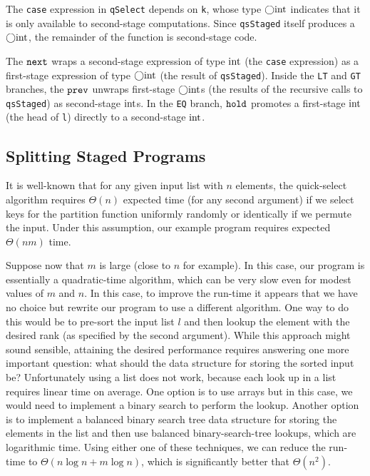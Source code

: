 \begin{abstrsyn}
The \texttt{case} expression in \texttt{qSelect} depends on \texttt{k}, whose
type $\bigcirc{\rm int}$ indicates that it is only available to second-stage
computations. Since \texttt{qsStaged} itself produces a $\bigcirc{\rm int}$, the
remainder of the function is second-stage code.

The ${\tt next}$ wraps a second-stage expression of type ${\rm int}$ (the \texttt{case}
expression) as a first-stage expression of type $\bigcirc{\rm int}$ (the result 
of \texttt{qsStaged}). Inside the \texttt{LT} and \texttt{GT} branches, the
${\tt prev}$ unwraps first-stage $\bigcirc{\rm int}$s (the results of the recursive calls
to \texttt{qsStaged}) as second-stage ${\rm int}$s. In the \texttt{EQ} branch,
${\tt hold}$ promotes a first-stage ${\rm int}$ (the head of \texttt{l}) directly to a
second-stage ${\rm int}$.




\subsection{Splitting Staged Programs}



It is well-known that for any given input list with $n$ elements, the
quick-select algorithm requires $\Theta(n)$ expected time (for any
second argument) if we select keys for the partition function
uniformly randomly or identically if we permute the input. Under this
assumption, our example program requires expected $\Theta(nm)$ time.

Suppose now that $m$ is large (close to $n$ for example).  In this
case, our program is essentially a quadratic-time algorithm, which can
be very slow even for modest values of $m$ and $n$. In this case, to
improve the run-time it appears that we have no choice but rewrite our
program to use a different algorithm.  One way to do this would be to
pre-sort the input list $l$ and then lookup the element with the
desired rank (as specified by the second argument).  While this
approach might sound sensible, attaining the desired performance
requires answering one more important question: what should the data
structure for storing the sorted input be?  Unfortunately using a list
does not work, because each look up in a list requires linear time on
average. One option is to use arrays but in this case, we would need
to implement a binary search to perform the lookup.  Another option is
to implement a balanced binary search tree data structure for storing
the elements in the list and then use balanced binary-search-tree
lookups, which are logarithmic time.  Using either one of these
techniques, we can reduce the run-time to $\Theta(n\log{n} + m\log{n})$,
which is significantly better that $\Theta(n^2)$.



\end{abstrsyn}
